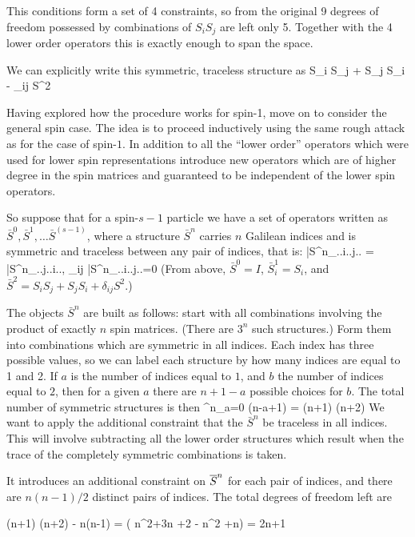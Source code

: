 This conditions form a set of 4 constraints, so from the original 9 degrees of freedom possessed by combinations of $S_i S_j$ are left only 5.  Together with the 4 lower order operators this is exactly enough to span the space.

We can explicitly write this symmetric, traceless structure as
\beq
	 S_i S_j + S_j S_i - \delta_{ij} S^2
\eeq

Having explored how the procedure works for spin-1, move on to consider the general spin case.   The idea is to proceed inductively using the same rough attack as for the case of spin-$1$.  In addition to all the ``lower order'' operators which were used for lower spin representations introduce new operators which are of higher degree in the spin matrices and guaranteed to be independent of the lower spin operators.

So suppose that for a spin-$s-1$ particle we have a set of operators written as $\bar{S}^0, \bar{S}^1, \ldots \bar{S}^{(s-1)}$, where a structure $\bar{S}^n$ carries $n$ Galilean indices and is symmetric and traceless between any pair of indices, that is:
\beq
	\bar{S}^n_{..i..j..} = \bar{S}^n_{..j..i..}, \; \delta_{ij} \bar{S}^n_{..i..j..}=0
\eeq 
(From above, $\bar{S}^0=I$, $\bar{S}^1_i = S_i$, and $\bar{S}^2 = S_i S_j + S_j S_i + \delta_{ij} S^2$.) 

The objects $\bar{S}^n$ are built as follows: start with all combinations involving the product of exactly $n$ spin matrices.  (There are $3^n$ such structures.)  Form them into combinations which are symmetric in all indices.  Each index has three possible values, so we can label each structure by how many indices are equal to 1 and 2.  If $a$ is the number of indices equal to $1$, and $b$ the number of indices equal to $2$, then for a given $a$ there are $n+1-a$ possible choices for $b$.  The total number of symmetric structures is then
\beq
	\sum^n_{a=0} (n-a+1) =  (n+1) (n+2)
\eeq
We want to apply the additional constraint that the $\bar{S}^n$ be traceless in all indices.  This will involve subtracting all the lower order structures which result when the trace of the completely symmetric combinations is taken.  %

It introduces an additional constraint on $\overline{S}^n$ for each pair of indices, and there are $n (n-1)/2$ distinct pairs of indices.  The total degrees of freedom left are

\beq
	 (n+1) (n+2) -  n(n-1) 
		= \left( n^2+3n +2 - n^2 +n\right )
		= 2n+1
\eeq

